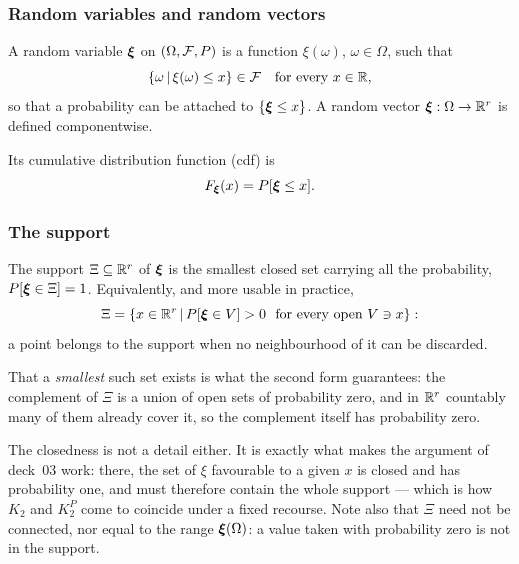 \documentclass[aspectratio=169]{beamer}
\begin{document}
\begin{frame}
\frametitle{Random variables and random vectors}

A {\red random variable} ${\boldsymbol{\xi}}$ on $(\Omega, {\mathcal{F}}, P)$ is a function $\xi(\omega)$, $\omega \in \Omega$, such that
\[
\lbrace \omega \,|\, \xi(\omega) \leq x \rbrace \in {\mathcal{F}} \quad \text{for every } x \in {\mathbb{R}},
\]
so that a probability can be attached to $\lbrace {\boldsymbol{\xi}} \leq x \rbrace$. A {\red random vector} ${\boldsymbol{\xi}}: \Omega \rightarrow {\mathbb{R}}^r$ is defined componentwise.

\mbox{}

Its {\red cumulative distribution function} (cdf) is
\[
F_{{\boldsymbol{\xi}}}(x) = P[{\boldsymbol{\xi}} \leq x].
\]

\end{frame}

\begin{frame}
\frametitle{The support}

The {\red support} $\Xi \subseteq {\mathbb{R}}^r$ of ${\boldsymbol{\xi}}$ is the {\red smallest closed set} carrying all the probability, $P[{\boldsymbol{\xi}} \in \Xi] = 1$. Equivalently, and more usable in practice,
\[
\Xi = \lbrace x \in {\mathbb{R}}^r \,|\, P[{\boldsymbol{\xi}} \in V] > 0 \ \text{ for every open } V \ni x \rbrace :
\]
a point belongs to the support when no neighbourhood of it can be discarded.

\mbox{}

That a {\it smallest} such set exists is what the second form guarantees: the complement of $\Xi$ is a union of open sets of probability zero, and in ${\mathbb{R}}^r$ countably many of them already cover it, so the complement itself has probability zero.

\mbox{}

{\footnotesize The {\red closedness} is not a detail either. It is exactly what makes the argument of deck~03 work: there, the set of $\xi$ favourable to a given $x$ is closed and has probability one, and must therefore contain the whole support --- which is how $K_2$ and $K_2^P$ come to coincide under a fixed recourse. Note also that $\Xi$ need not be connected, nor equal to the range ${\boldsymbol{\xi}}(\Omega)$: a value taken with probability zero is not in the support.}

\end{frame}
\end{document}

